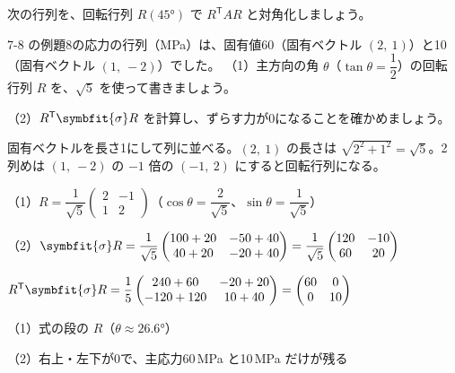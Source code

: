 \begin{jibun}
次の行列を、回転行列 $R(45°)$ で $R^{\mathsf T}AR$ と対角化しましょう。
\end{jibun}

\begin{reidai}[応力を主方向で見る]
7-8 の例題8の応力の行列（MPa）は、固有値60（固有ベクトル $(2,\ 1)$）と10（固有ベクトル $(1,\ -2)$）でした。
（1）主方向の角 $\theta$（$\tan\theta=\dfrac12$）の回転行列 $R$ を、$\sqrt5$ を使って書きましょう。\par
（2）$R^{\mathsf T}\symbfit{\sigma} R$ を計算し、ずらす力が0になることを確かめましょう。\par
\kangaekata 固有ベクトルを長さ1にして列に並べる。$(2,\ 1)$ の長さは $\sqrt{2^2+1^2}=\sqrt5$。2列めは $(1,\ -2)$ の $-1$ 倍の $(-1,\ 2)$ にすると回転行列になる。\par
\shiki\kviijs{}\zw{} （1）$R=\dfrac{1}{\sqrt5}\begin{pmatrix}2&-1\\1&2\end{pmatrix}$（$\cos\theta=\dfrac{2}{\sqrt5}$、$\sin\theta=\dfrac{1}{\sqrt5}$）\par
\kviijb （2）$\symbfit{\sigma} R=\dfrac{1}{\sqrt5}\begin{pmatrix}100+20&-50+40\\40+20&-20+40\end{pmatrix}=\dfrac{1}{\sqrt5}\begin{pmatrix}120&-10\\60&20\end{pmatrix}$\par
\kviijb $R^{\mathsf T}\symbfit{\sigma} R=\dfrac15\begin{pmatrix}240+60&-20+20\\-120+120&10+40\end{pmatrix}=\begin{pmatrix}60&0\\0&10\end{pmatrix}$\par
\kotae\kviijs{}\zw{} （1）式の段の $R$（$\theta\approx26.6°$）\par
\kviijb （2）右上・左下が0で、主応力60\,MPa と10\,MPa だけが残る
\end{reidai}

